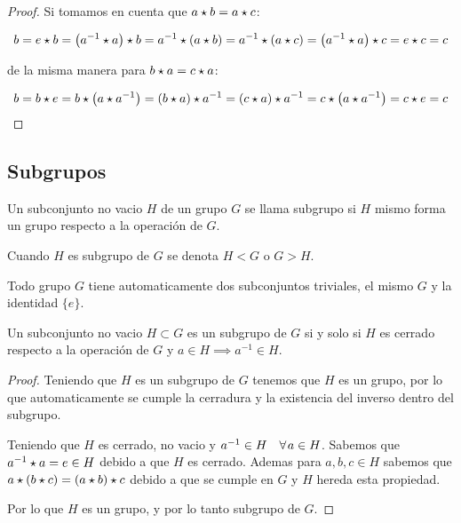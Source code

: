         \begin{proof}
            Si tomamos en cuenta que $a \star b = a \star c$:

            \begin{equation*}
                b = e \star b = \left( a^{-1} \star a \right) \star b = a^{-1} \star \left( a \star b \right) = a^{-1} \star \left( a \star c \right) = \left( a^{-1} \star a \right) \star c = e \star c = c
            \end{equation*}

            de la misma manera para $b \star a = c \star a$:

            \begin{equation*}
                b = b \star e = b \star \left( a \star a^{-1} \right) = \left( b \star a \right) \star a^{-1} = \left( c \star a \right) \star a^{-1} = c \star \left( a \star a^{-1} \right) = c \star e = c
            \end{equation*}
        \end{proof}

    \newpage
    \subsection{Subgrupos}

        \begin{definicion}
            Un subconjunto no vacio $H$ de un grupo $G$ se llama subgrupo si $H$ mismo forma un grupo respecto a la operación de $G$.

            Cuando $H$ es subgrupo de $G$ se denota $H < G$ o $G > H$.
        \end{definicion}

        \begin{observacion}
            Todo grupo $G$ tiene automaticamente dos subconjuntos triviales, el mismo $G$ y la identidad $\{e\}$.
        \end{observacion}

        \begin{proposicion}
            Un subconjunto no vacio $H \subset G$ es un subgrupo de $G$ si y solo si $H$ es cerrado respecto a la operación de $G$ y $a \in H \implies a^{-1} \in H$.
        \end{proposicion}

        \begin{proof}
            Teniendo que $H$ es un subgrupo de $G$ tenemos que $H$ es un grupo, por lo que automaticamente se cumple la cerradura y la existencia del inverso dentro del subgrupo.

            Teniendo que $H$ es cerrado, no vacio y $a^{-1} \in H \quad \forall \mkern2mu a \in H$.
            Sabemos que $a^{-1} \star a  = e \in H$ debido a que $H$ es cerrado.
            Ademas para $a, b, c \in H$ sabemos que $a \star (b \star c) = (a \star b) \star c$ debido a que se cumple en $G$ y $H$ hereda esta propiedad.

            Por lo que $H$ es un grupo, y por lo tanto subgrupo de $G$.
        \end{proof}

